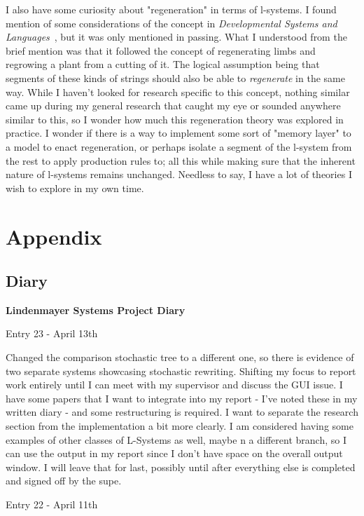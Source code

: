 \documentclass[]{final_report}
\begin{document}
I also have some curiosity about "regeneration" in terms of l-systems. I found mention of some considerations of the concept in \emph{Developmental Systems and Languages}~\cite{LIN:1972}, but it was only mentioned in passing. What I understood from the brief mention was that it followed the concept of regenerating limbs and regrowing a plant from a cutting of it. The logical assumption being that segments of these kinds of strings should also be able to \emph{regenerate} in the same way. While I haven't looked for research specific to this concept, nothing similar came up during my general research that caught my eye or sounded anywhere similar to this, so I wonder how much this regeneration theory was explored in practice. I wonder if there is a way to implement some sort of "memory layer" to a model to enact regeneration, or perhaps isolate a segment of the l-system from the rest to apply production rules to; all this while making sure that the inherent nature of l-systems remains unchanged. Needless to say, I have a lot of theories I wish to explore in my own time.




\chapter{Appendix}

\section{Diary}

\textbf{Lindenmayer Systems Project Diary}

Entry 23 - April 13th

Changed the comparison stochastic tree to a different one, so there is evidence of two separate systems showcasing stochastic rewriting. Shifting my focus to report work entirely until I can meet with my supervisor and discuss the GUI issue. I have some papers that I want to integrate into my report - I've noted these in my written diary - and some restructuring is required. I want to separate the research section from the implementation a bit more clearly. I am considered having some examples of other classes of L-Systems as well, maybe n a different branch, so I can use the output in my report since I don't have space on the overall output window. I will leave that for last, possibly until after everything else is completed and signed off by the supe.

Entry 22 - April 11th
\end{document}
